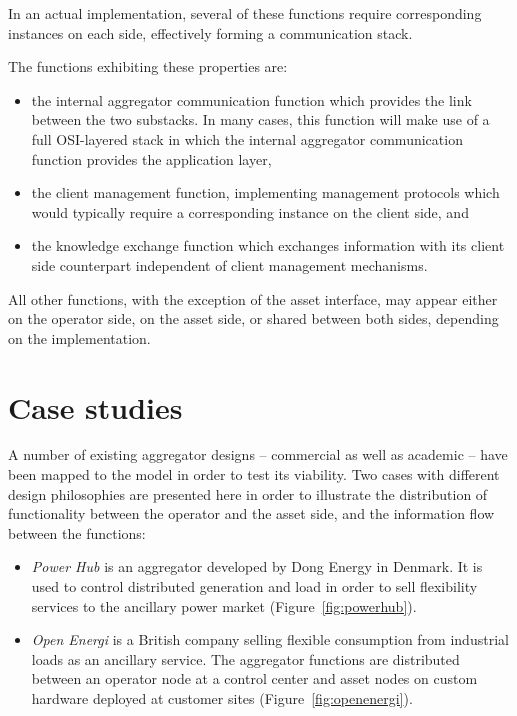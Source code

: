In an actual implementation, several of these functions require corresponding instances on each side, effectively forming a communication stack. 

The functions exhibiting these properties are:
\begin{itemize}
\item the internal aggregator communication function which provides the link between the two substacks. In many cases, this function will make use of a full OSI-layered stack in which the internal aggregator communication function provides the application layer,
\item the client management function, implementing management protocols which would typically require a corresponding instance on the client side, and
\item the knowledge exchange function which exchanges information with its client side counterpart independent of client management mechanisms.
\end{itemize}

All other functions, with the exception of the asset interface, may appear either on the operator side, on the asset side, or shared between both sides, depending on the implementation.

\section{Case studies} 
\label{sec:applic}

A number of existing aggregator designs -- commercial as well as academic -- have been mapped to the model in order to test its viability. Two cases with different design philosophies are presented here in order to illustrate the distribution of functionality between the operator and the asset side, and the information flow between the functions:
\begin{itemize}
	\item \emph{Power Hub} is an aggregator developed by Dong Energy in Denmark. It is used to control distributed generation and load in order to sell flexibility services to the ancillary power market (Figure~\ref{fig:powerhub}).
\item \emph{Open Energi} is a British company selling flexible consumption from industrial loads as an ancillary service. The aggregator functions are distributed between an operator node at a control center and asset nodes on custom hardware deployed at customer sites (Figure~\ref{fig:openenergi}).
\end{itemize}

